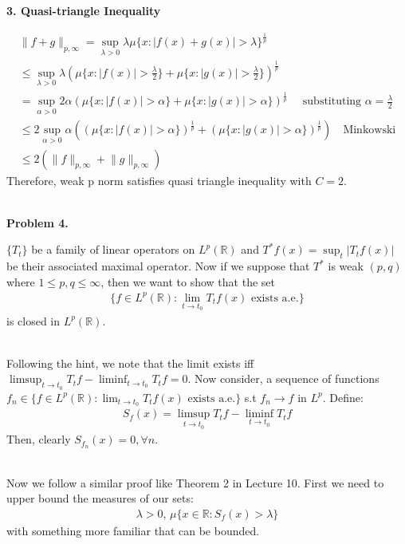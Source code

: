 \documentclass{article}
\newcommand{\R}{\mathbb{R}}
\begin{document}
\textbf{3. Quasi-triangle Inequality}

\begin{gather*}
    \lVert f + g \rVert_{p, \infty} = \sup_{\lambda > 0} \lambda \mu\{x: |f(x) + g(x)| > \lambda\}^{\frac{1}{p}}\\
    \leq \sup_{\lambda > 0} \lambda \left( \mu\{x: |f(x)| > \frac{\lambda}{2}\} + \mu\{x: |g(x)| > \frac{\lambda}{2}\} \right)^{\frac{1}{p}} \\
    = \sup_{\alpha > 0} 2\alpha \left( \mu\{x: |f(x)| > \alpha\} + \mu\{x: |g(x)| > \alpha\} \right)^{\frac{1}{p}} \quad \text{ substituting } \alpha = \frac{\lambda}{2}\\
    \leq 2 \sup_{\alpha > 0} \alpha \left( \left( \mu\{x: |f(x)| > \alpha\} \right)^{\frac{1}{p}} +  \left( \mu\{x: |g(x)| > \alpha\} \right)^{\frac{1}{p}} \right) \quad \text{Minkowski}\\
    \leq 2 \left( \lVert f \rVert_{p, \infty} + \lVert g \rVert_{p, \infty} \right)
\end{gather*}
Therefore, weak p norm satisfies quasi triangle inequality with $C = 2$.
\\~

\textbf{Problem 4. } 

$\{T_t\}$ be a family of linear operators on $L^p(\R)$ and $T^* f(x) = \sup_t |T_tf(x)|$ be their associated maximal operator. Now if we suppose that $T^*$ is weak $(p,q)$ where $1 \leq p,q \leq \infty$, then we want to show that the set
\begin{gather*}
    \{f \in L^p(\R): \lim_{t \to t_0} T_tf(x) \text{ exists a.e.}\}
\end{gather*}
is closed in $L^p(\R)$.
\\~

Following the hint, we note that the limit exists iff $\limsup_{t\to t_0} T_tf - \liminf_{t \to t_0}T_t f = 0$. Now consider, a sequence of functions $f_n \in \{f \in L^p(\R): \lim_{t \to t_0} T_tf(x) \text{ exists a.e.}\}$ s.t $f_n \to f$ in $L^p$. Define:
\begin{gather*}
    S_f(x) = \limsup_{t\to t_0} T_tf - \liminf_{t \to t_0}T_t f
\end{gather*}
Then, clearly $S_{f_n}(x) = 0, \forall n$.
\\~

Now we follow a similar proof like Theorem 2 in Lecture 10. First we need to upper bound the measures of our sets:
\begin{gather*}
    \lambda>0,\, \mu\{x\in \R: S_f(x) > \lambda\}
\end{gather*}
with something more familiar that can be bounded.
\end{document}
